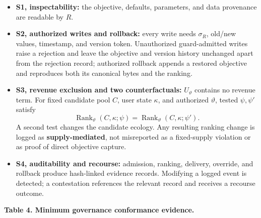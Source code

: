 \documentclass[
  11pt]{article}
\providecommand{\tightlist}{%
  \setlength{\itemsep}{0pt}\setlength{\parskip}{0pt}}
\begin{document}
\begin{itemize}
\tightlist
\item
  \textbf{S1, inspectability:} the objective, defaults, parameters, and
  data provenance are readable by \(R\).
\item
  \textbf{S2, authorized writes and rollback:} every write needs
  \(\sigma_R\), old/new values, timestamp, and version token.
  Unauthorized guard-admitted writes raise a rejection and leave the
  objective and version history unchanged apart from the rejection
  record; authorized rollback appends a restored objective and
  reproduces both its canonical bytes and the ranking.
\item
  \textbf{S3, revenue exclusion and two counterfactuals:}
  \(U_\vartheta\) contains no revenue term. For fixed candidate pool
  \(C\), user state \(\kappa\), and authorized \(\vartheta\), tested
  \(\psi,\psi'\) satisfy
  \[\operatorname{Rank}_\vartheta(C,\kappa;\psi)=\operatorname{Rank}_\vartheta(C,\kappa;\psi').\]
  A second test changes the candidate ecology. Any resulting ranking
  change is logged as \textbf{supply-mediated}, not misreported as a
  fixed-supply violation or as proof of direct objective capture.
\item
  \textbf{S4, auditability and recourse:} admission, ranking, delivery,
  override, and rollback produce hash-linked evidence records. Modifying
  a logged event is detected; a contestation references the relevant
  record and receives a recourse outcome.
\end{itemize}

\textbf{Table 4. Minimum governance conformance evidence.}
\end{document}

